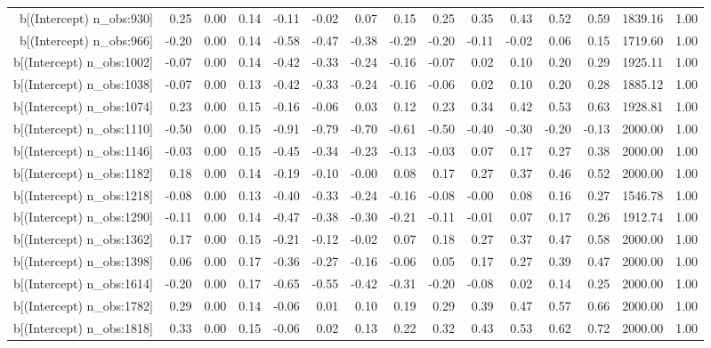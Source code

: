 \begin{table}[ht]
\begin{tabular}{rrrrrrrrrrrrrrr}
  b[(Intercept) n\_obs:930] & 0.25 & 0.00 & 0.14 & -0.11 & -0.02 & 0.07 & 0.15 & 0.25 & 0.35 & 0.43 & 0.52 & 0.59 & 1839.16 & 1.00 \\ 
  b[(Intercept) n\_obs:966] & -0.20 & 0.00 & 0.14 & -0.58 & -0.47 & -0.38 & -0.29 & -0.20 & -0.11 & -0.02 & 0.06 & 0.15 & 1719.60 & 1.00 \\ 
  b[(Intercept) n\_obs:1002] & -0.07 & 0.00 & 0.14 & -0.42 & -0.33 & -0.24 & -0.16 & -0.07 & 0.02 & 0.10 & 0.20 & 0.29 & 1925.11 & 1.00 \\ 
  b[(Intercept) n\_obs:1038] & -0.07 & 0.00 & 0.13 & -0.42 & -0.33 & -0.24 & -0.16 & -0.06 & 0.02 & 0.10 & 0.20 & 0.28 & 1885.12 & 1.00 \\ 
  b[(Intercept) n\_obs:1074] & 0.23 & 0.00 & 0.15 & -0.16 & -0.06 & 0.03 & 0.12 & 0.23 & 0.34 & 0.42 & 0.53 & 0.63 & 1928.81 & 1.00 \\ 
  b[(Intercept) n\_obs:1110] & -0.50 & 0.00 & 0.15 & -0.91 & -0.79 & -0.70 & -0.61 & -0.50 & -0.40 & -0.30 & -0.20 & -0.13 & 2000.00 & 1.00 \\ 
  b[(Intercept) n\_obs:1146] & -0.03 & 0.00 & 0.15 & -0.45 & -0.34 & -0.23 & -0.13 & -0.03 & 0.07 & 0.17 & 0.27 & 0.38 & 2000.00 & 1.00 \\ 
  b[(Intercept) n\_obs:1182] & 0.18 & 0.00 & 0.14 & -0.19 & -0.10 & -0.00 & 0.08 & 0.17 & 0.27 & 0.37 & 0.46 & 0.52 & 2000.00 & 1.00 \\ 
  b[(Intercept) n\_obs:1218] & -0.08 & 0.00 & 0.13 & -0.40 & -0.33 & -0.24 & -0.16 & -0.08 & -0.00 & 0.08 & 0.16 & 0.27 & 1546.78 & 1.00 \\ 
  b[(Intercept) n\_obs:1290] & -0.11 & 0.00 & 0.14 & -0.47 & -0.38 & -0.30 & -0.21 & -0.11 & -0.01 & 0.07 & 0.17 & 0.26 & 1912.74 & 1.00 \\ 
  b[(Intercept) n\_obs:1362] & 0.17 & 0.00 & 0.15 & -0.21 & -0.12 & -0.02 & 0.07 & 0.18 & 0.27 & 0.37 & 0.47 & 0.58 & 2000.00 & 1.00 \\ 
  b[(Intercept) n\_obs:1398] & 0.06 & 0.00 & 0.17 & -0.36 & -0.27 & -0.16 & -0.06 & 0.05 & 0.17 & 0.27 & 0.39 & 0.47 & 2000.00 & 1.00 \\ 
  b[(Intercept) n\_obs:1614] & -0.20 & 0.00 & 0.17 & -0.65 & -0.55 & -0.42 & -0.31 & -0.20 & -0.08 & 0.02 & 0.14 & 0.25 & 2000.00 & 1.00 \\ 
  b[(Intercept) n\_obs:1782] & 0.29 & 0.00 & 0.14 & -0.06 & 0.01 & 0.10 & 0.19 & 0.29 & 0.39 & 0.47 & 0.57 & 0.66 & 2000.00 & 1.00 \\ 
  b[(Intercept) n\_obs:1818] & 0.33 & 0.00 & 0.15 & -0.06 & 0.02 & 0.13 & 0.22 & 0.32 & 0.43 & 0.53 & 0.62 & 0.72 & 2000.00 & 1.00 \\ 

\end{tabular}
\end{table}
